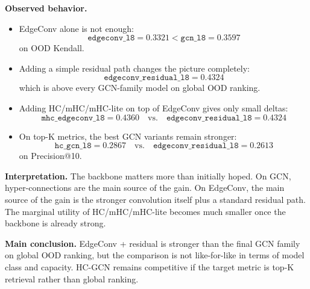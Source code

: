 \documentclass[11pt,a4paper]{article}
\begin{document}
\textbf{Observed behavior.}
\begin{itemize}[noitemsep]
  \item EdgeConv alone is not enough:
  \[
  \texttt{edgeconv\_l8} = 0.3321 < \texttt{gcn\_l8} = 0.3597
  \]
  on OOD Kendall.
  \item Adding a simple residual path changes the picture completely:
  \[
  \texttt{edgeconv\_residual\_l8} = 0.4324
  \]
  which is above every GCN-family model on global OOD ranking.
  \item Adding HC/mHC/mHC-lite on top of EdgeConv gives only small deltas:
  \[
  \texttt{mhc\_edgeconv\_l8} = 0.4360
  \quad \text{vs.} \quad
  \texttt{edgeconv\_residual\_l8} = 0.4324
  \]
  \item On top-K metrics, the best GCN variants remain stronger:
  \[
  \texttt{hc\_gcn\_l8} = 0.2867
  \quad \text{vs.} \quad
  \texttt{edgeconv\_residual\_l8} = 0.2613
  \]
  on Precision@10.
\end{itemize}

\textbf{Interpretation.}
The backbone matters more than initially hoped.
On GCN, hyper-connections are the main source of the gain.
On EdgeConv, the main source of the gain is the stronger convolution itself plus a standard residual path.
The marginal utility of HC/mHC/mHC-lite becomes much smaller once the backbone is already strong.

\textbf{Main conclusion.}
EdgeConv + residual is stronger than the final GCN family on global OOD ranking,
but the comparison is not like-for-like in terms of model class and capacity.
HC-GCN remains competitive if the target metric is top-K retrieval rather than global ranking.
\end{document}
